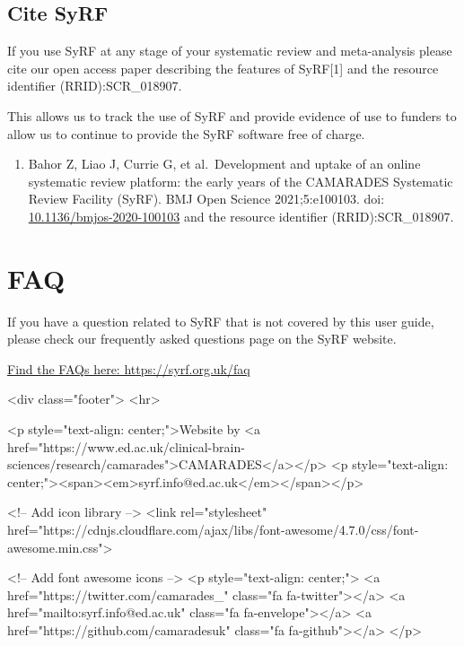 \documentclass[
]{book}
\providecommand{\tightlist}{%
  \setlength{\itemsep}{0pt}\setlength{\parskip}{0pt}}
\begin{document}
\hypertarget{cite-syrf}{%
\section{Cite SyRF}\label{cite-syrf}}

If you use SyRF at any stage of your systematic review and meta-analysis please cite our open access paper describing the features of SyRF{[}1{]} and the resource identifier (RRID):SCR\_018907.

This allows us to track the use of SyRF and provide evidence of use to funders to allow us to continue to provide the SyRF software free of charge.

\begin{enumerate}
\def\labelenumi{\arabic{enumi}.}
\tightlist
\item
  Bahor Z, Liao J, Currie G, et al.~Development and uptake of an online systematic review platform: the early years of the CAMARADES Systematic Review Facility (SyRF). BMJ Open Science 2021;5:e100103. doi: \href{https://doi.org/10.1136/bmjos-2020-100103}{10.1136/bmjos-2020-100103} and the resource identifier (RRID):SCR\_018907.
\end{enumerate}

\hypertarget{faq}{%
\chapter{FAQ}\label{faq}}

If you have a question related to SyRF that is not covered by this user guide, please check our frequently asked questions page on the SyRF website.

\href{https://syrf.org.uk/faq}{Find the FAQs here: https://syrf.org.uk/faq}

  

<div class="footer">
<hr>



<p style="text-align: center;">Website by <a href="https://www.ed.ac.uk/clinical-brain-sciences/research/camarades">CAMARADES</a></p>
<p style="text-align: center;"><span><em>syrf.info@ed.ac.uk</em></span></p>




<!-- Add icon library -->
<link rel="stylesheet" href="https://cdnjs.cloudflare.com/ajax/libs/font-awesome/4.7.0/css/font-awesome.min.css">



<!-- Add font awesome icons -->
<p style="text-align: center;">
<a href="https://twitter.com/camarades_" class="fa fa-twitter"></a>
<a href="mailto:syrf.info@ed.ac.uk" class="fa fa-envelope"></a>
<a href="https://github.com/camaradesuk" class="fa fa-github"></a>
</p>
\end{document}
